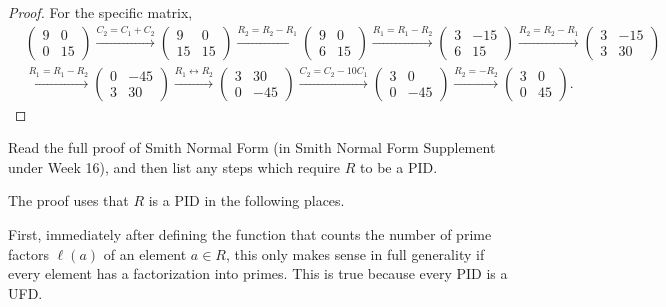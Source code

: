 \documentclass[addpoints,10pt]{exam}
\theoremstyle{plain}
\theoremstyle{definition}
\newtheorem{prob}[thm]{Problem}
\theoremstyle{plain}
\theoremstyle{plain}
\theoremstyle{definition}
\let\oldprob\prob
\let\endoldprob\endprob
\renewenvironment{prob}
  {\begin{singlespace}\oldprob}
  {\endoldprob\end{singlespace}}
\begin{document}
\begin{proof}
For the specific matrix,
\begin{align*}
&\begin{pmatrix}
9&0\\
0&15
\end{pmatrix}
\overset{C_2= C_1+C_2}{\longrightarrow}
\begin{pmatrix}
9&0\\
15&15
\end{pmatrix}
\overset{R_2= R_2-R_1}{\longrightarrow}
\begin{pmatrix}
9&0\\
6&15
\end{pmatrix}
\overset{R_1= R_1-R_2}{\longrightarrow}
\begin{pmatrix}
3&-15\\
6&15
\end{pmatrix}
\overset{R_2= R_2-R_1}{\longrightarrow}
\begin{pmatrix}
3&-15\\
3&30
\end{pmatrix}\\
&\overset{R_1= R_1-R_2}{\longrightarrow}
\begin{pmatrix}
0&-45\\
3&30
\end{pmatrix}
\overset{R_1\leftrightarrow R_2}{\longrightarrow}
\begin{pmatrix}
3&30\\
0&-45
\end{pmatrix}
\overset{C_2=C_2-10C_1}{\longrightarrow}
\begin{pmatrix}
3&0\\
0&-45
\end{pmatrix}
\overset{R_2=-R_2}{\longrightarrow}
\begin{pmatrix}
3&0\\
0&45
\end{pmatrix}.
\end{align*}
\end{proof}


\begin{prob}
Read the full proof of Smith Normal Form (in Smith Normal Form Supplement under Week 16), and then list any steps which require $R$ to be a PID.
\end{prob}

The proof uses that $R$ is a PID in the following places.

First, immediately after defining the function that counts the number of
prime factors $\ell(a)$ of an element $a\in R$, this only makes sense in
full generality if every element has a factorization into primes. This is
true because every PID is a UFD.
\end{document}
